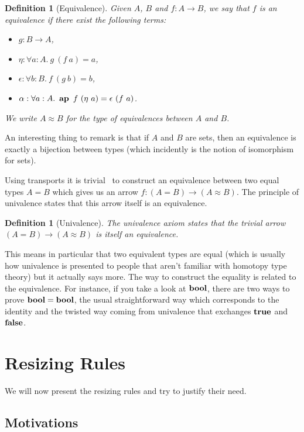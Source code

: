 \documentclass[11pt]{article}
\theoremstyle{plain}
\newtheorem{definition}[theorem]{Definition}
\theoremstyle{remark}
\begin{document}
\begin{definition}[Equivalence]
  Given $A$, $B$ and $f : A \to B$, we say that $f$ is an equivalence
  if there exist the following terms:
  \begin{itemize}
    \item $g : B \to A$,
    \item $\eta : \forall a:A.\ g\ (f\ a) = a$,
    \item $\epsilon : \forall b:B.\ f\ (g\ b) = b$,
    \item $\alpha : \forall a:A.\ \ap\ f\ (\eta\ a) = \epsilon\ (f\ a)$.
  \end{itemize}
  We write $A \approx B$ for the type of equivalences between $A$ and $B$.
\end{definition}

\noindent
An interesting thing to remark is that if $A$ and $B$ are sets, then an
equivalence is exactly a bijection between types (which incidently is the notion
of isomorphism for sets).

Using transports it is trivial~ to construct an equivalence
between two equal types $A = B$ which gives us an arrow
$f : (A = B) \to (A \approx B)$.
The principle of univalence states that this arrow itself is an equivalence.

\begin{definition}[Univalence]
  The univalence axiom states that
  the trivial arrow $(A = B) \to (A \approx B)$ is itself an equivalence.
\end{definition}

\noindent
This means in particular that two equivalent types are equal (which is usually
how univalence is presented to people that aren't familiar with homotopy type
theory) but it actually says more. The way to construct the equality is related
to the equivalence.
For instance, if you take a look at $\operatorname{\mathbf{bool}}$, there are two ways to prove
$\operatorname{\mathbf{bool}} = \operatorname{\mathbf{bool}}$, the usual straightforward way which corresponds to the identity
and the twisted way coming from univalence that exchanges $\operatorname{\mathbf{true}}$ and $\operatorname{\mathbf{false}}$.

\section{Resizing Rules}

We will now present the resizing rules and try to justify their need.

\subsection{Motivations}
\end{document}
